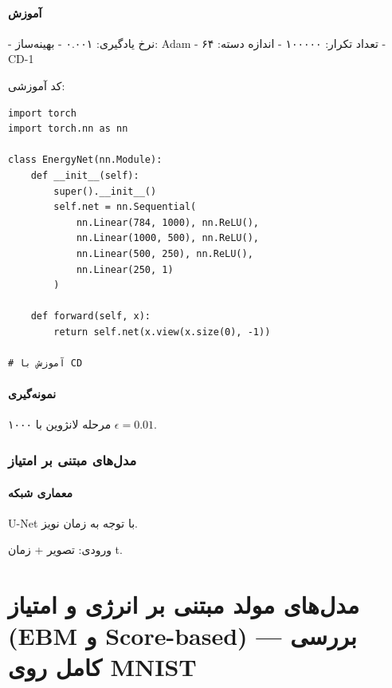 \subsubsection{آموزش}
- نرخ یادگیری: ۰.۰۰۱
- بهینه‌ساز: Adam
- تعداد تکرار: ۱۰۰۰۰۰
- اندازه دسته: ۶۴
- CD-1

کد آموزشی:
\begin{program}[H]
\begin{verbatim}
import torch
import torch.nn as nn

class EnergyNet(nn.Module):
    def __init__(self):
        super().__init__()
        self.net = nn.Sequential(
            nn.Linear(784, 1000), nn.ReLU(),
            nn.Linear(1000, 500), nn.ReLU(),
            nn.Linear(500, 250), nn.ReLU(),
            nn.Linear(250, 1)
        )
    
    def forward(self, x):
        return self.net(x.view(x.size(0), -1))

# آموزش با CD
\end{verbatim}
\caption{شبکه انرژی و کد آموزشی}
\label{ebm_code}
\end{program}

\subsubsection{نمونه‌گیری}
۱۰۰۰ مرحله لانژوین با \( \epsilon = 0.01 \).

\subsection{مدل‌های مبتنی بر امتیاز}
\subsubsection{معماری شبکه}
U-Net با توجه به زمان نویز.

ورودی: تصویر + زمان t.


\def \Subject {مدل‌های مولد مبتنی بر انرژی و امتیاز (EBM و Score-based) — بررسی کامل روی MNIST}
\def \Session { یک}
\renewcommand{\chaptername}{سوال}
\chapter{\Subject}

